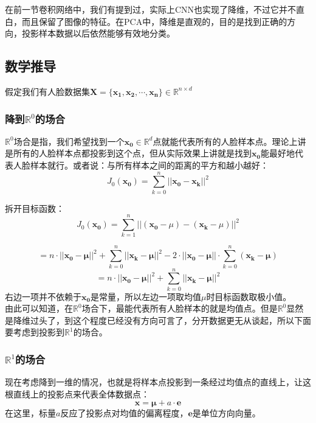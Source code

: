 \documentclass[12pt]{article}
\begin{document}
在前一节卷积网络中，我们有提到过，实际上CNN也实现了降维，不过它并不直白，而且保留了图像的特征。在PCA中，降维是直观的，目的是找到正确的方向，投影样本数据以后依然能够有效地分类。

\subsection{数学推导}

假定我们有人脸数据集$\mathbf{X} = \{\mathbf{x_1}, \mathbf{x_2}, \cdots, \mathbf{x_n} \} \in \mathbb{R}^{n \times d}$

\subsubsection{降到$\mathbb{R}^0$的场合}

$\mathbb{R}^0$场合是指，我们希望找到一个$\mathbf{x_0} \in \mathbb{R}^{d}$点就能代表所有的人脸样本点。理论上讲是所有的人脸样本点都投影到这个点，但从实际效果上讲就是找到$\mathbf{x_0}$能最好地代表人脸样本就行。或者说：与所有样本之间的距离的平方和越小越好：
\[ J_0(\mathbf{x_0}) = \sum_{k = 0}^n || \mathbf{x_0} - \mathbf{x_k} ||^2 \]

拆开目标函数：
\[ J_0(\mathbf{x_0}) = \sum_{k = 1}^n || (\mathbf{x_0} - \mu ) - ( \mathbf{x_k} - \mu ) ||^2 \]

\[  = n\cdot || \mathbf{x_0} - \mathbf{\mu} ||^2 + \sum_{k = 0}^n || \mathbf{x_k} - \mathbf{\mu} ||^2  - 2 \cdot ||\mathbf{x_0} - \mathbf{\mu} || \cdot  \sum_{k = 0}^n ( \mathbf{x_k} - \mathbf{\mu} ) \]
\[  = n \cdot || \mathbf{x_0} - \mathbf{\mu} ||^2 + \sum_{k = 0}^n || \mathbf{x_k} - \mathbf{\mu} ||^2  \]
右边一项并不依赖于$\mathbf{x_0}$是常量，所以左边一项取均值$\mu$时目标函数取极小值。\\

由此可以知道，在$\mathbb{R}^0$场合下，最能代表所有人脸样本的就是均值点。但是$\mathbb{R}^0$显然是降维过头了，到这个程度已经没有方向可言了，分开数据更无从谈起，所以下面要考虑到投影到$\mathbb{R}^1$的场合。

\subsubsection{$\mathbb{R}^1$的场合}

现在考虑降到一维的情况，也就是将样本点投影到一条经过均值点的直线上，让这根直线上的投影点来代表全体数据点：
\[ \mathbf{x} = \mathbf{\mu} + a \cdot \mathbf{e} \]
在这里，标量$a$反应了投影点对均值的偏离程度，$\mathbf{e}$是单位方向向量。\\
\end{document}
